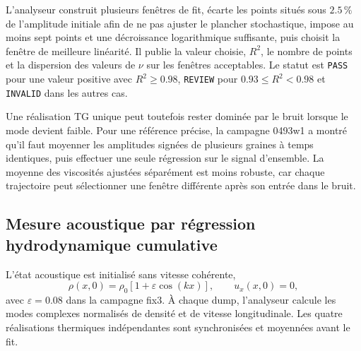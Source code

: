 \documentclass[11pt,a4paper]{article}
\begin{document}
L'analyseur construit plusieurs fenêtres de fit, écarte les points situés sous $2.5\,\%$ de l'amplitude initiale afin de ne pas ajuster le plancher stochastique, impose au moins sept points et une décroissance logarithmique suffisante, puis choisit la fenêtre de meilleure linéarité. Il publie la valeur choisie, $R^2$, le nombre de points et la dispersion des valeurs de $\nu$ sur les fenêtres acceptables. Le statut est \texttt{PASS} pour une valeur positive avec $R^2\geq0.98$, \texttt{REVIEW} pour $0.93\leq R^2<0.98$ et \texttt{INVALID} dans les autres cas.

Une réalisation TG unique peut toutefois rester dominée par le bruit lorsque le mode devient faible. Pour une référence précise, la campagne 0493w1 a montré qu'il faut moyenner les amplitudes signées de plusieurs graines à temps identiques, puis effectuer une seule régression sur le signal d'ensemble. La moyenne des viscosités ajustées séparément est moins robuste, car chaque trajectoire peut sélectionner une fenêtre différente après son entrée dans le bruit.

\subsection{Mesure acoustique par régression hydrodynamique cumulative}

L'état acoustique est initialisé sans vitesse cohérente,
\begin{equation}
  \rho(x,0)=\rho_0\left[1+\varepsilon\cos(kx)\right],
  \qquad u_x(x,0)=0,
\end{equation}
avec $\varepsilon=0.08$ dans la campagne fix3. À chaque dump, l'analyseur calcule les modes complexes normalisés de densité et de vitesse longitudinale. Les quatre réalisations thermiques indépendantes sont synchronisées et moyennées avant le fit.
\end{document}
